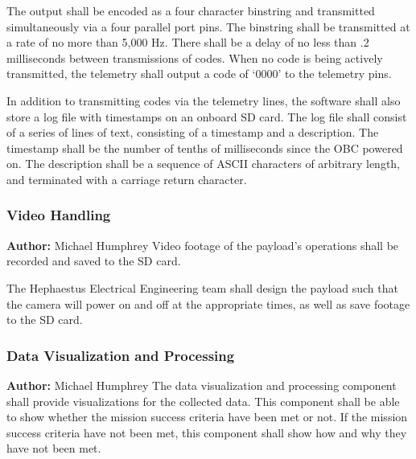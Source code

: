 The output shall be encoded as a four character \gls{binstring} and transmitted
simultaneously via a four parallel port pins.
The \gls{binstring} shall be transmitted at a rate of no more than 5,000 Hz.
There shall be a delay of no less than .2 milliseconds between transmissions
of codes.
When no code is being actively transmitted, the telemetry shall output a code
of `0000' to the telemetry pins.

In addition to transmitting codes via the telemetry lines, the software shall also
store a log file with timestamps on an onboard SD card.
The log file shall consist of a series of lines of text, consisting of a timestamp
and a description.
The timestamp shall be the number of tenths of milliseconds since the \gls{OBC}
powered on.
The description shall be a sequence of \gls{ASCII} characters of arbitrary length,
and terminated with a carriage return character.

\subsubsection{Video Handling}
\textbf{Author:} Michael Humphrey
Video footage of the \gls{payload}'s operations shall be recorded and saved to the
SD card.

The Hephaestus Electrical Engineering team shall design the payload such that the 
camera will power on and off at the appropriate times, as well as save footage to
the SD card. 

\subsubsection{Data Visualization and Processing}
\textbf{Author:} Michael Humphrey
The data visualization and processing component shall provide visualizations
for the collected data.
This component shall be able to show whether the mission success criteria have
been met or not.
If the mission success criteria have not been met, this component shall show how
and why they have not been met.


